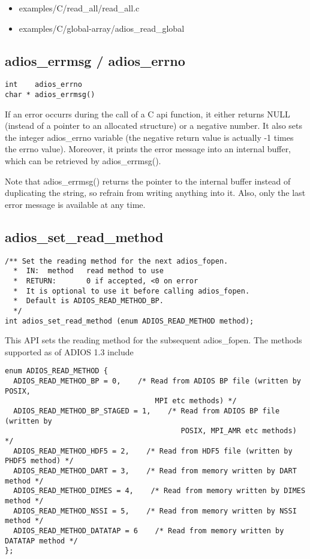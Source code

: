 \documentclass{report}
\begin{document}
\begin{itemize}
\renewcommand{\labelitemi}{$-$}
\item examples/C/read\_all/read\_all.c

\item examples/C/global-array/adios\_read\_global\label{HToc182553399}
\end{itemize}

\subsection{adios\_errmsg / adios\_errno}

\begin{lstlisting}[]
int    adios_errno
char * adios_errmsg()
\end{lstlisting}

If an error occurrs during the call of a C api function, it either returns NULL 
(instead of a pointer to an allocated structure) or a negative number. It also 
sets the integer adios\_errno variable (the negative return value is actually -1 
times the errno value). Moreover, it prints the error message into an internal 
buffer, which can be retrieved by adios\_errmsg(). 

Note that adios\_errmsg() returns the pointer to the internal buffer instead of 
duplicating the string, so refrain from writing anything into it. Also, only the 
last error message is available at any time.\label{HToc182553400}

\subsection{adios\_set\_read\_method}
\begin{lstlisting}[]
/** Set the reading method for the next adios_fopen.
  *  IN:  method   read method to use
  *  RETURN:       0 if accepted, <0 on error
  *  It is optional to use it before calling adios_fopen. 
  *  Default is ADIOS_READ_METHOD_BP.
  */
int adios_set_read_method (enum ADIOS_READ_METHOD method);
\end{lstlisting}

This API sets the reading method for the subsequent adios\_fopen. The methods supported 
as of ADIOS 1.3 include

\begin{lstlisting}[]
enum ADIOS_READ_METHOD {
  ADIOS_READ_METHOD_BP = 0,    /* Read from ADIOS BP file (written by POSIX,
                                   MPI etc methods) */
  ADIOS_READ_METHOD_BP_STAGED = 1,    /* Read from ADIOS BP file (written by
                                         POSIX, MPI_AMR etc methods) */
  ADIOS_READ_METHOD_HDF5 = 2,    /* Read from HDF5 file (written by PHDF5 method) */
  ADIOS_READ_METHOD_DART = 3,    /* Read from memory written by DART method */
  ADIOS_READ_METHOD_DIMES = 4,    /* Read from memory written by DIMES method */
  ADIOS_READ_METHOD_NSSI = 5,    /* Read from memory written by NSSI method */
  ADIOS_READ_METHOD_DATATAP = 6    /* Read from memory written by DATATAP method */
};
\end{lstlisting}
\end{document}
